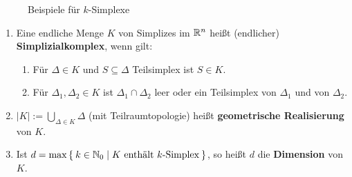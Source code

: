 \begin{figure}[ht]
    \centering

    \label{fig:k-simplexe}
    \caption{Beispiele für $k$-Simplexe}
\end{figure}


\begin{definition}%
    \begin{enumerate}[label=\alph*),ref=\thedefinition.\alph*]
        \item Eine endliche Menge $K$ von Simplizes im $\mathbb{R}^n$
              heißt (endlicher) \textbf{Simplizialkomplex},
              wenn gilt:
            \begin{enumerate}[label=(\roman*),ref=\theenumii.\roman*]
                \item Für $\Delta \in K$ und $S \subseteq \Delta$ Teilsimplex
                      ist $S \in K$.
                \item \label{def:simplizialkomplex.ii} Für $\Delta_1, \Delta_2 \in K$ ist 
                      $\Delta_1 \cap \Delta_2$ leer oder ein 
                        Teilsimplex von $\Delta_1$ und von 
                      $\Delta_2$. 
            \end{enumerate}
        \item $|K| := \bigcup_{\Delta \in K} \Delta$ (mit Teilraumtopologie)
              heißt \textbf{geometrische Realisierung}
              von $K$.
        \item Ist $d = \max \Set{ k \in \ensuremath{\mathbb{N}}_0 | K \text{ enthält } k\text{-Simplex}}$,
              so heißt $d$ die \textbf{Dimension} von
              $K$.
    \end{enumerate}
\end{definition}

